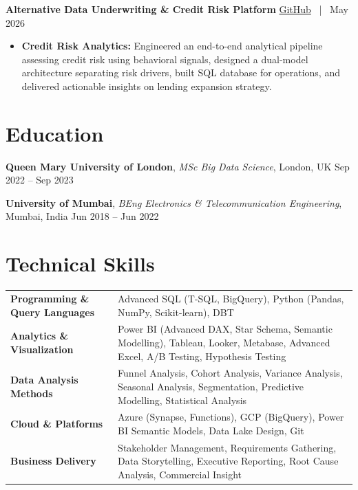 \documentclass[10pt, a4paper]{article}
\begin{document}
\textbf{Alternative Data Underwriting \& Credit Risk Platform} \hfill \href{https://github.com/VishalP44/Thin-File-Borrower-Risk-Assessment-Platform}{GitHub} \, | \, May 2026
\begin{itemize}
    \item \textbf{Credit Risk Analytics:} Engineered an end-to-end analytical pipeline assessing credit risk using behavioral signals, designed a dual-model architecture separating risk drivers, built SQL database for operations, and delivered actionable insights on lending expansion strategy.
\end{itemize}

\section*{Education}

\textbf{Queen Mary University of London}, \textit{MSc Big Data Science}, London, UK \hfill Sep 2022 -- Sep 2023

\vspace{4pt}

\textbf{University of Mumbai}, \textit{BEng Electronics \& Telecommunication Engineering}, Mumbai, India \hfill Jun 2018 -- Jun 2022

\section*{Technical Skills}

\begin{tabularx}{\textwidth}{>{\bfseries}l X}
    Programming \& Query Languages & Advanced SQL (T-SQL, BigQuery), Python (Pandas, NumPy, Scikit-learn), DBT \\
    Analytics \& Visualization & Power BI (Advanced DAX, Star Schema, Semantic Modelling), Tableau, Looker, Metabase, Advanced Excel, A/B Testing, Hypothesis Testing \\
    Data Analysis Methods & Funnel Analysis, Cohort Analysis, Variance Analysis, Seasonal Analysis, Segmentation, Predictive Modelling, Statistical Analysis \\
    Cloud \& Platforms & Azure (Synapse, Functions), GCP (BigQuery), Power BI Semantic Models, Data Lake Design, Git \\
    Business Delivery & Stakeholder Management, Requirements Gathering, Data Storytelling, Executive Reporting, Root Cause Analysis, Commercial Insight
\end{tabularx}
\end{document}

